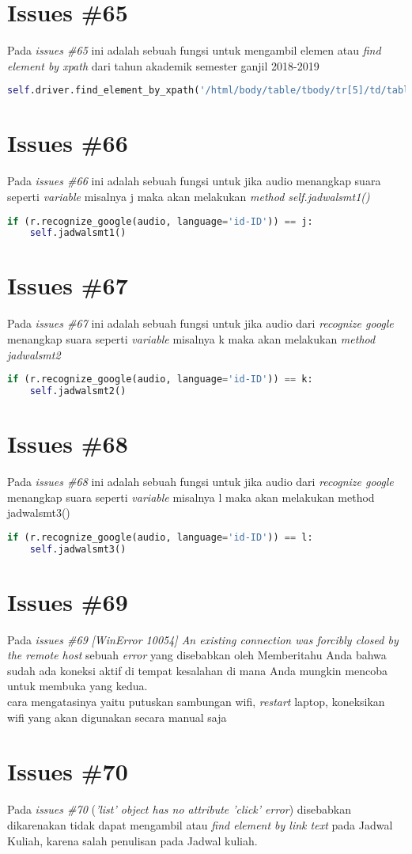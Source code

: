 \section{Issues \#65}
Pada \textit{issues \#65} ini adalah sebuah fungsi untuk mengambil elemen atau \textit{find element by xpath} dari tahun akademik semester ganjil 2018-2019
\begin{lstlisting}[language=Python]
self.driver.find_element_by_xpath('/html/body/table/tbody/tr[5]/td/table[3]/tbody/tr[1]/td[2]/p[1]/table/tbody/tr/td[3]/select/option[4]').click()
\end{lstlisting}

\section{Issues \#66}
Pada \textit{issues \#66} ini adalah sebuah fungsi untuk jika audio menangkap suara seperti \textit{variable} misalnya j maka akan melakukan \textit{method self.jadwalsmt1()}
\begin{lstlisting}[language=Python]
if (r.recognize_google(audio, language='id-ID')) == j:
    self.jadwalsmt1()
\end{lstlisting}

\section{Issues \#67}
Pada \textit{issues \#67} ini adalah sebuah fungsi untuk jika audio dari \textit{recognize google} menangkap suara seperti \textit{variable} misalnya k maka akan melakukan \textit{method jadwalsmt2}
\begin{lstlisting}[language=Python]
if (r.recognize_google(audio, language='id-ID')) == k:
    self.jadwalsmt2()
\end{lstlisting}

\section{Issues \#68}
Pada \textit{issues \#68} ini adalah sebuah fungsi untuk jika audio dari \textit{recognize google} menangkap suara seperti \textit{variable} misalnya l maka akan melakukan method jadwalsmt3()
\begin{lstlisting}[language=Python]
if (r.recognize_google(audio, language='id-ID')) == l:
    self.jadwalsmt3()
\end{lstlisting}


\section{Issues \#69}
Pada \textit{issues \#69} \textit{[WinError 10054] An existing connection was forcibly closed by the remote host} sebuah \textit{error} yang disebabkan oleh Memberitahu Anda bahwa sudah ada koneksi aktif di tempat kesalahan di mana Anda mungkin mencoba untuk membuka yang kedua. \\
cara mengatasinya yaitu putuskan sambungan wifi, \textit{restart} laptop, koneksikan wifi yang akan digunakan secara manual saja

\section{Issues \#70}
Pada \textit{issues \#70} (\textit{'list' object has no attribute 'click'
error}) disebabkan dikarenakan tidak dapat mengambil atau \textit{find element by link text} pada Jadwal Kuliah, karena salah penulisan pada Jadwal kuliah.
